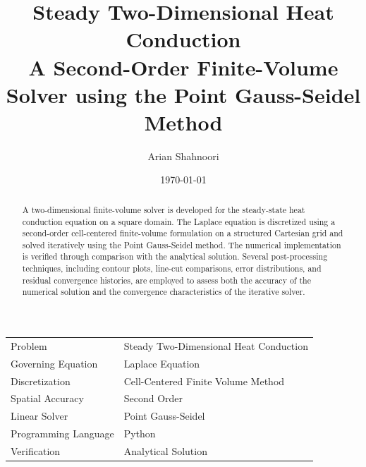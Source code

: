 \documentclass[11pt,a4paper]{article}
\title{
    \Huge\textbf{Steady Two-Dimensional Heat Conduction}\\[0.4cm]
    \Large
    A Second-Order Finite-Volume Solver using the Point Gauss-Seidel Method
}
\author{
    \Large Arian Shahnoori
}
\date{\today}
\begin{document}

\maketitle
\thispagestyle{empty}

\vspace{0.8cm}

\begin{abstract}
A two-dimensional finite-volume solver is developed for the steady-state heat conduction equation on a square domain. The Laplace equation is discretized using a second-order cell-centered finite-volume formulation on a structured Cartesian grid and solved iteratively using the Point Gauss-Seidel method. The numerical implementation is verified through comparison with the analytical solution. Several post-processing techniques, including contour plots, line-cut comparisons, error distributions, and residual convergence histories, are employed to assess both the accuracy of the numerical solution and the convergence characteristics of the iterative solver.
\end{abstract}

\vspace{0.5cm}

\begin{center}
\begin{tabular}{ll}
\toprule
Problem & Steady Two-Dimensional Heat Conduction\\
Governing Equation & Laplace Equation\\
Discretization & Cell-Centered Finite Volume Method\\
Spatial Accuracy & Second Order\\
Linear Solver & Point Gauss-Seidel\\
Programming Language & Python\\
Verification & Analytical Solution\\
\bottomrule
\end{tabular}
\end{center}

\newpage

\tableofcontents

\newpage















\appendix


\end{document}
